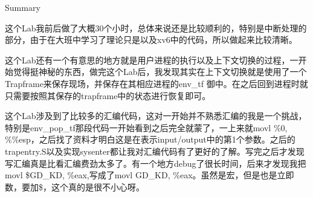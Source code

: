 \documentclass[GBK,winfonts,a4paper,10pt]{ctexart}
\begin{document}
\begin{section}{ Summary }
\par
这个Lab我前后做了大概30个小时，总体来说还是比较顺利的，特别是中断处理的部分，由于在大班中学习了理论只是以及xv6中的代码，所以做起来比较清晰。
\par
这个Lab还有一个有意思的地方就是用户进程的执行以及上下文切换的过程，一开始觉得挺神秘的东西，做完这个Lab后，我发现其实在上下文切换就是使用了一个Trapframe来保存现场，并保存在其相应进程的env\_tf 御中。在之后回到进程时就只需要按照其保存的trapframe中的状态进行恢复即可。
\par
这个Lab涉及到了比较多的汇编代码，这对一开始并不熟悉汇编的我是一个挑战，特别是env\_pop\_tf那段代码一开始看到之后完全就蒙了，一上来就movl \%0, \%\%esp，之后找了资料才明白这是在表示input/output中的第1个参数。之后的trapentry.S以及实现sysenter都让我对汇编代码有了更好的了解。写完之后才发现写汇编真是比看汇编费劲太多了。有一个地方debug了很长时间，后来才发现我把movl \$GD\_KD, \%eax,写成了movl GD\_KD, \%eax。虽然是宏，但是也是立即数，要加\$，这个真的是很不小心呀。
\end{section}
\end{document}
